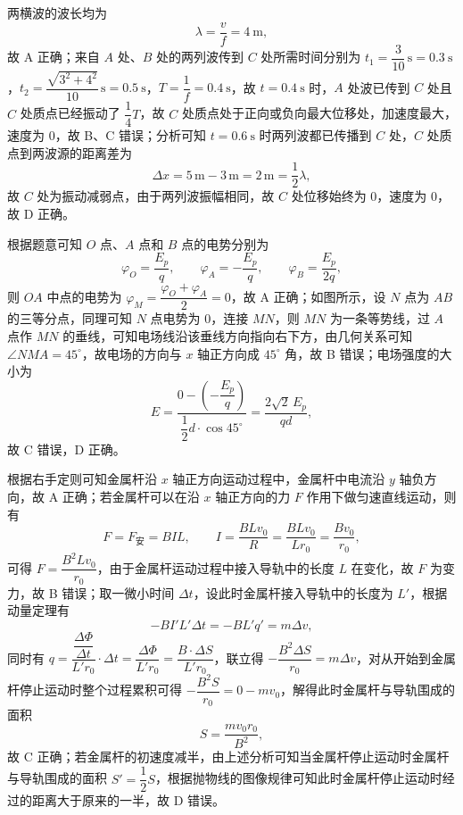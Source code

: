 \begin{answer}
两横波的波长均为
\[
  \lambda=\frac{v}{f}=\SI{4}{\metre},
\]
故 A 正确；来自 $A$ 处、$B$ 处的两列波传到 $C$ 处所需时间分别为 $t_{1}=\dfrac{3}{10}\,\si{\second}=\SI{0.3}{\second}$，$t_{2}=\dfrac{\sqrt{3^{2}+4^{2}}}{10}\,\si{\second}=\SI{0.5}{\second}$，$T=\dfrac{1}{f}=\SI{0.4}{\second}$，故 $t=\SI{0.4}{\second}$ 时，$A$ 处波已传到 $C$ 处且 $C$ 处质点已经振动了 $\dfrac{1}{4}T$，故 $C$ 处质点处于正向或负向最大位移处，加速度最大，速度为 0，故 B、C 错误；分析可知 $t=\SI{0.6}{\second}$ 时两列波都已传播到 $C$ 处，$C$ 处质点到两波源的距离差为
\[
  \Delta x=5\,\si{\metre}-3\,\si{\metre}=2\,\si{\metre}=\frac{1}{2}\lambda,
\]
故 $C$ 处为振动减弱点，由于两列波振幅相同，故 $C$ 处位移始终为 0，速度为 0，故 D 正确。
\end{answer}

\begin{answer}
根据题意可知 $O$ 点、$A$ 点和 $B$ 点的电势分别为
\[
  \varphi_{O}=\frac{E_{p}}{q},\qquad
  \varphi_{A}=-\frac{E_{p}}{q},\qquad
  \varphi_{B}=\frac{E_{p}}{2q},
\]
则 $OA$ 中点的电势为 $\varphi_{M}=\dfrac{\varphi_{O}+\varphi_{A}}{2}=0$，故 A 正确；如图所示，设 $N$ 点为 $AB$ 的三等分点，同理可知 $N$ 点电势为 0，连接 $MN$，则 $MN$ 为一条等势线，过 $A$ 点作 $MN$ 的垂线，可知电场线沿该垂线方向指向右下方，由几何关系可知 $\angle NMA=45^{\circ}$，故电场的方向与 $x$ 轴正方向成 $45^{\circ}$ 角，故 B 错误；电场强度的大小为
\[
  E=\frac{0-\left(-\dfrac{E_{p}}{q}\right)}{\dfrac{1}{2}d\cdot\cos45^{\circ}}
    =\frac{2\sqrt{2}\,E_{p}}{qd},
\]
故 C 错误，D 正确。

\end{answer}

\begin{answer}
根据右手定则可知金属杆沿 $x$ 轴正方向运动过程中，金属杆中电流沿 $y$ 轴负方向，故 A 正确；若金属杆可以在沿 $x$ 轴正方向的力 $F$ 作用下做匀速直线运动，则有
\[
  F=F_{\text{安}}=BIL,\qquad
  I=\frac{BLv_{0}}{R}=\frac{BLv_{0}}{Lr_{0}}=\frac{Bv_{0}}{r_{0}},
\]
可得 $F=\dfrac{B^{2}Lv_{0}}{r_{0}}$，由于金属杆运动过程中接入导轨中的长度 $L$ 在变化，故 $F$ 为变力，故 B 错误；取一微小时间 $\Delta t$，设此时金属杆接入导轨中的长度为 $L'$，根据动量定理有
\[
  -BI'L'\Delta t=-BL'q'=m\Delta v,
\]
同时有 $q=\dfrac{\dfrac{\Delta\Phi}{\Delta t}}{L'r_{0}}\cdot\Delta t=\dfrac{\Delta\Phi}{L'r_{0}}=\dfrac{B\cdot\Delta S}{L'r_{0}}$，联立得 $-\dfrac{B^{2}\Delta S}{r_{0}}=m\Delta v$，对从开始到金属杆停止运动时整个过程累积可得 $-\dfrac{B^{2}S}{r_{0}}=0-mv_{0}$，解得此时金属杆与导轨围成的面积
\[
  S=\frac{mv_{0}r_{0}}{B^{2}},
\]
故 C 正确；若金属杆的初速度减半，由上述分析可知当金属杆停止运动时金属杆与导轨围成的面积 $S'=\dfrac{1}{2}S$，根据抛物线的图像规律可知此时金属杆停止运动时经过的距离大于原来的一半，故 D 错误。
\end{answer}

